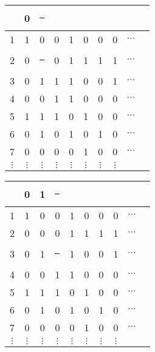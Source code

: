 \documentclass[compress,17pt]{beamer}
\newcommand\hl{\bgroup\markoverwith
    {\textcolor{yellow}{\rule[-.5ex]{.1pt}{2.5ex}}}\ULon}
\begin{document}
\begin{frame}
  \begin{tabular}{ | c | c c c c c c c c c }
    \hline
    &  0 & \hl 1 \\
    \hline

    1 & 1 & 0 & 0 & 1 & 0 & 0 & 0 & $\cdots$\\
    2 & 0 & \hl 0 & 0 & 1 & 1 & 1 & 1 & $\cdots$\\
    3 & 0 & 1 & 1 & 1 & 0 & 0 & 1 & $\cdots$\\
    4 & 0 & 0 & 1 & 1 & 0 & 0 & 0 & $\cdots$\\
    5 & 1 & 1 & 1 & 0 & 1 & 0 & 0 & $\cdots$\\
    6 & 0 & 1 & 0 & 1 & 0 & 1 & 0 & $\cdots$\\
    7 & 0 & 0 & 0 & 0 & 1 & 0 & 0 & $\cdots$\\
    $\vdots$ & $\vdots$ & $\vdots$ & $\vdots$ & $\vdots$ & $\vdots$ & $\vdots$ & $\vdots$ & \\
  \end{tabular}
\end{frame}

\begin{frame}
  \begin{tabular}{ | c | c c c c c c c c c }
    \hline
    &  0 & 1 & \hl 0 \\
    \hline

    1 & 1 & 0 & 0 & 1 & 0 & 0 & 0 & $\cdots$\\
    2 & 0 & 0 & 0 & 1 & 1 & 1 & 1 & $\cdots$\\
    3 & 0 & 1 & \hl 1 & 1 & 0 & 0 & 1 & $\cdots$\\
    4 & 0 & 0 & 1 & 1 & 0 & 0 & 0 & $\cdots$\\
    5 & 1 & 1 & 1 & 0 & 1 & 0 & 0 & $\cdots$\\
    6 & 0 & 1 & 0 & 1 & 0 & 1 & 0 & $\cdots$\\
    7 & 0 & 0 & 0 & 0 & 1 & 0 & 0 & $\cdots$\\
    $\vdots$ & $\vdots$ & $\vdots$ & $\vdots$ & $\vdots$ & $\vdots$ & $\vdots$ & $\vdots$ & \\
  \end{tabular}
\end{frame}
\end{document}
